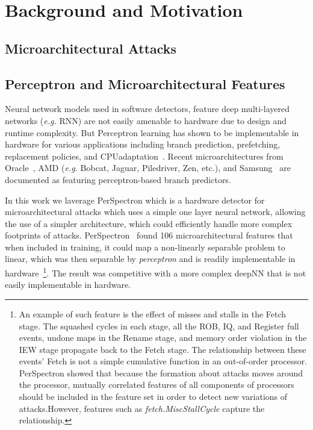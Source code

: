 \section{Background and Motivation}\label{background}\label{motiv}

\subsection{Microarchitectural Attacks}

\subsection{Perceptron and Microarchitectural Features}

 


Neural network models used in software detectors, feature deep multi-layered  networks ({\em e.g.} RNN) are not easily amenable to hardware due to design and runtime complexity. But Perceptron learning has shown to be implementable in hardware for various  applications including branch prediction, prefetching, replacement policies, and CPUadaptation~\cite{intelISCA2019}. Recent microarchitectures from Oracle~\cite{SPARCT4}, AMD ({\em e.g.} Bobcat, Jaguar, Piledriver, Zen, etc.), and Samsung~\cite{Mongoose,M3} are documented as featuring perceptron-based branch predictors.


In this work we laverage PerSpectron which is a  hardware detector for microarchitectural attacks which uses a simple one layer neural network,  allowing the use of a simpler architecture, which could efficiently 
handle more complex footprints of attacks.
PerSpectron~\cite{PerSpectron} found 106 microarchitectural features that when included in training, it could map a non-linearly separable problem to linear, which was then 
separable by {\em perceptron} and is readily implementable in hardware~\footnote{An example of such feature is the effect of misses and stalls 
in the Fetch stage. The squashed cycles in each stage, all the ROB, IQ, and 
Register full events, undone maps in the Rename stage, and memory order 
violation in the IEW stage propagate back to the Fetch stage. The relationship 
between these events' Fetch is not a simple cumulative function in an out-of-order 
processor. PerSpectron showed that because the formation about attacks moves around the
processor, mutually correlated features of all components of processors should be included in the feature set in order to detect new variations of attacks.However, features such as \textit{fetch.MiscStallCycle} capture the 
relationship.}. The result was competitive 
with a more complex deepNN that is not easily implementable in hardware.

